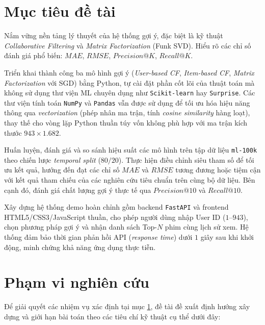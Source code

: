 \documentclass[../BTL.tex]{subfiles}
\begin{document}
\section{Mục tiêu đề tài}
\label{section:1.2}
\begin{description}[leftmargin=1.5em, itemsep=0.5em]
    \item[\textbf{Mục tiêu lý thuyết:}] Nắm vững nền tảng lý thuyết của hệ thống gợi ý, đặc biệt là kỹ thuật \textit{Collaborative Filtering} và \textit{Matrix Factorization} (Funk SVD). Hiểu rõ các chỉ số đánh giá phổ biến: $MAE$, $RMSE$, $Precision@K$, $Recall@K$.
    
    \item[\textbf{Mục tiêu kỹ thuật:}] Triển khai thành công ba mô hình gợi ý (\textit{User-based CF}, \textit{Item-based CF}, \textit{Matrix Factorization} với SGD) bằng Python, tự cài đặt phần cốt lõi của thuật toán mà không sử dụng thư viện ML chuyên dụng như \texttt{Scikit-learn} hay \texttt{Surprise}. Các thư viện tính toán \texttt{NumPy} và \texttt{Pandas} vẫn được sử dụng để tối ưu hóa hiệu năng thông qua \textit{vectorization} (phép nhân ma trận, tính \textit{cosine similarity} hàng loạt), thay thế cho vòng lặp Python thuần túy vốn không phù hợp với ma trận kích thước $943 \times 1.682$.
    
    \item[\textbf{Mục tiêu thực nghiệm:}] Huấn luyện, đánh giá và so sánh hiệu suất các mô hình trên tập dữ liệu \texttt{ml-100k} theo chiến lược \textit{temporal split} ($80/20$). Thực hiện điều chỉnh siêu tham số để tối ưu kết quả, hướng đến đạt các chỉ số $MAE$ và $RMSE$ tương đương hoặc tiệm cận với kết quả tham chiếu của các nghiên cứu tiêu chuẩn trên cùng bộ dữ liệu. Bên cạnh đó, đánh giá chất lượng gợi ý thực tế qua $Precision@10$ và $Recall@10$.
    
    \item[\textbf{Mục tiêu ứng dụng:}] Xây dựng hệ thống demo hoàn chỉnh gồm backend \texttt{FastAPI} và frontend HTML5/CSS3/JavaScript thuần, cho phép người dùng nhập User ID ($1$–$943$), chọn phương pháp gợi ý và nhận danh sách Top-$N$ phim cùng lịch sử xem. Hệ thống đảm bảo thời gian phản hồi API (\textit{response time}) dưới $1$ giây sau khi khởi động, minh chứng khả năng ứng dụng thực tiễn.
\end{description}

\section{Phạm vi nghiên cứu}
\label{section:1.3}
Để giải quyết các nhiệm vụ xác định tại mục \ref{section:1.2}, đề tài đề xuất định hướng xây dựng và giới hạn bài toán theo các tiêu chí kỹ thuật cụ thể dưới đây:
\end{document}
